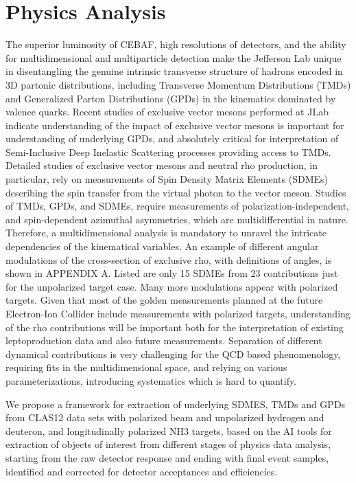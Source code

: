 \section{Physics Analysis}

The superior luminosity of CEBAF, high resolutions of detectors, and the ability for multidimensional and multiparticle detection make the Jefferson Lab unique in disentangling the genuine intrinsic transverse structure of hadrons encoded in 3D partonic distributions, including Transverse Momentum Distributions (TMDs)  and Generalized Parton Distributions (GPDs) in the kinematics dominated by valence quarks. Recent studies of exclusive vector mesons performed at JLab indicate understanding of the impact of exclusive vector mesons is important for understanding of underlying GPDs, and absolutely critical for interpretation of Semi-Inclusive Deep Inelastic Scattering processes providing access to TMDs.
Detailed studies of exclusive vector mesons and neutral rho production, in particular, rely on measurements of Spin Density Matrix Elements (SDMEs) describing the spin transfer from the virtual photon to the vector meson.
Studies of TMDs, GPDs, and SDMEs, require measurements of polarization-independent, and spin-dependent azimuthal asymmetries, which are multidifferential in nature. Therefore, a multidimensional analysis is mandatory to unravel the intricate dependencies of the kinematical variables. An example of different angular modulations of the cross-section of exclusive rho, with definitions of angles, is shown in APPENDIX A. Listed are only 15 SDMEs from 23 contributions just for the unpolarized target case. Many more modulations appear with polarized targets. Given that most of the golden measurements planned at the future Electron-Ion Collider include measurements with polarized targets, understanding of the rho contributions will be important both for the interpretation of existing leptoproduction data and also future measurements. 
Separation of different dynamical contributions is very challenging for the QCD based phenomenology, requiring fits in the multidimensional space, and relying on various parameterizations, introducing systematics which is hard to quantify.

We propose a framework for extraction of underlying SDMES, TMDs and GPDs from CLAS12 data sets with polarized beam and unpolarized hydrogen and deuteron, and longitudinally polarized NH3 targets, based on the AI tools for extraction of objects of interest from different stages of physics data analysis, starting from the raw detector response and ending with final event samples, identified and corrected for detector acceptances and efficiencies. 

